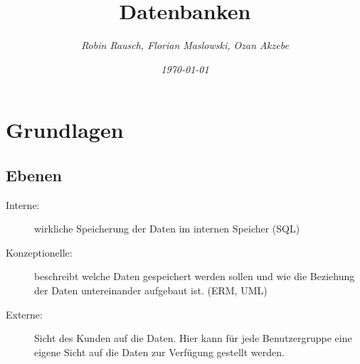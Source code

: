 \documentclass[12pt,a4paper]{article}
\author{\slshape Robin Rausch, Florian Maslowski, Ozan Akzebe}
\title{Datenbanken}
\date{\slshape \today}
\begin{document}
\maketitle
\tableofcontents
\newpage
\section{Grundlagen}
	\subsection{Ebenen}
		\begin{description}
			\item[Interne:] wirkliche Speicherung der Daten im internen Speicher (SQL)
			\item[Konzeptionelle:] beschreibt welche Daten gespeichert werden sollen und wie die Beziehung der Daten untereinander aufgebaut ist. (ERM, UML)
			\item[Externe:] Sicht des Kunden auf die Daten. Hier kann für jede Benutzergruppe eine eigene Sicht auf die Daten zur Verfügung gestellt werden.
		\end{description}
\end{document}

